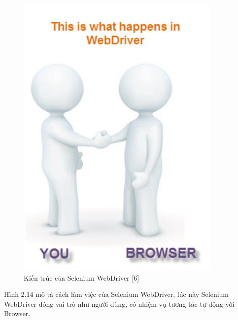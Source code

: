 \begin{center}
	\begin{figure}[htp]
		\begin{center}
			\includegraphics[width=10cm]{Chapter2/Pictures/picture214.jpg}
		\end{center}
		\caption{Kiến trúc của Selenium WebDriver [6]}
		\label{refpicture214}
	\end{figure}
\end{center}


Hình 2.14 mô tả cách làm việc của Selenium WebDriver, lúc này Selenium WebDriver đóng vai trò như người dùng, có nhiệm vụ tương tác tự động với Browser.

\newpage

